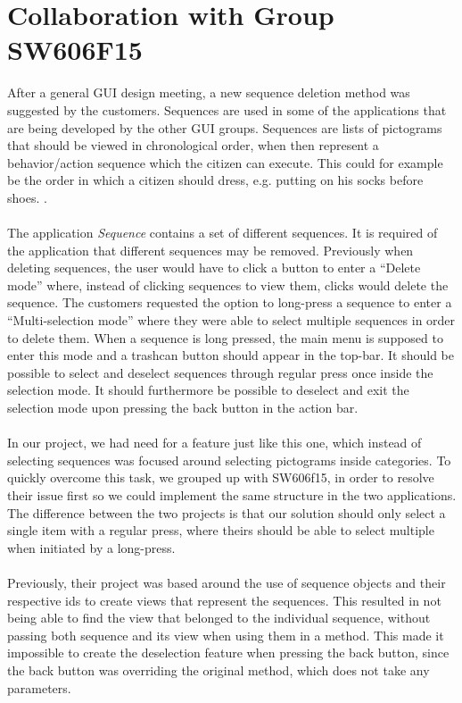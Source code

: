 \section{Collaboration with Group SW606F15}
\label{sec:collaboration_with_group_sw606f15}

After a general GUI design meeting, a new sequence deletion method was suggested by the customers. Sequences are used in some of the applications that are being developed by the other GUI groups. Sequences are lists of pictograms that should be viewed in chronological order, when then represent a behavior/action sequence which the citizen can execute. This could for example be the order in which a citizen should dress, e.g. putting on his socks before shoes. . 
\\\\
The application \emph{Sequence} contains a set of different sequences. It is required of the application that different sequences may be removed. Previously when deleting sequences, the user would have to click a button to enter a ``Delete mode'' where, instead of clicking sequences to view them, clicks would delete the sequence. The customers requested the option to long-press a sequence to enter a ``Multi-selection mode'' where they were able to select multiple sequences in order to delete them. When a sequence is long pressed, the main menu is supposed to enter this mode and a trashcan button should appear in the top-bar. It should be possible to select and deselect sequences through regular press once inside the selection mode. It should furthermore be possible to deselect and exit the selection mode upon pressing the back button in the action bar.
\\\\
In our project, we had need for a feature just like this one, which instead of selecting sequences was focused around selecting pictograms inside categories. To quickly overcome this task, we grouped up with SW606f15, in order to resolve their issue first so we could implement the same structure in the two applications. The difference between the two projects is that our solution should only select a single item with a regular press, where theirs should be able to select multiple when initiated by a long-press.
\\\\
Previously, their project was based around the use of sequence objects and their respective ids to create views that represent the sequences. This resulted in not being able to find the view that belonged to the individual sequence, without passing both sequence and its view when using them in a method. This made it impossible to create the deselection feature when pressing the back button, since the back button was overriding the original  method, which does not take any parameters.
